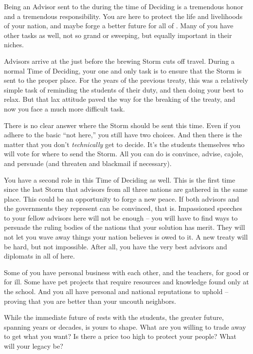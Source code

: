 \documentclass[blue]{GL2020}
\begin{document}
\name{\bAdvisorBlue{}}

Being an Advisor sent to the \pSchool{} during the time of Deciding is a tremendous honor and a tremendous responsibility. You are here to protect the life and livelihoods of your nation, and maybe forge a better future for all of \pEarth{}. Many of you have other tasks as well, not so grand or sweeping, but equally important in their niches.

Advisors arrive at the \pSc{} just before the brewing Storm cuts off travel. During a normal Time of Deciding, your one and only task is to ensure that the Storm is sent to the proper place. For the years of the previous treaty, this was a relatively simple task of reminding the students of their duty, and then doing your best to relax. But that lax attitude paved the way for the breaking of the treaty, and now you face a much more difficult task.

There is no clear answer where the Storm should be sent this time. Even if you adhere to the basic ``not here,'' you still have two choices. And then there is the matter that you don't \emph{technically} get to decide. It's the students themselves who will vote for where to send the Storm. All you can do is convince, advise, cajole, and persuade (and threaten and blackmail if necessary).

You have a second role in this Time of Deciding as well. This is the first time since the last Storm that advisors from all three nations are gathered in the same place. This could be an opportunity to forge a new peace. If both advisors and the governments they represent can be convinced, that is. Impassioned speeches to your fellow advisors here will not be enough -- you will have to find ways to persuade the ruling bodies of the nations that your solution has merit. They will not let you wave away things your nation believes is owed to it. A new treaty will be hard, but not impossible. After all, you have the very best advisors and diplomats in all of \pEarth{} here.

Some of you have personal business with each other, and the teachers, for good or for ill. Some have pet projects that require resources and knowledge found only at the school. And you all have personal and national reputations to uphold -- proving that you are better than your uncouth neighbors.

While the immediate future of \pEarth{} rests with the students, the greater future, spanning years or decades, is yours to shape. What are you willing to trade away to get what you want? Is there a price too high to protect your people? What will your legacy be?
\end{document}
